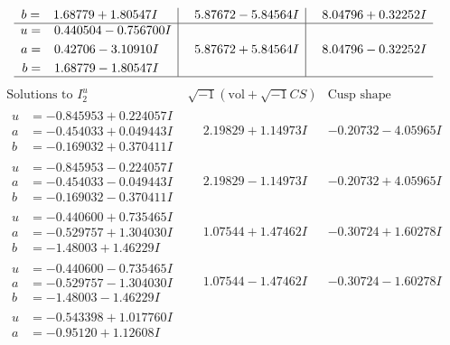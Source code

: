 \documentclass[1p]{elsarticle_modified}
\theoremstyle{definition}
\newcommand{\I}{\sqrt{-1}}
\begin{document}
$$\begin{array}{c|c|c}
\begin{aligned}
b &= \phantom{-}1.68779 + 1.80547 I\end{aligned}
 & \phantom{-}5.87672 - 5.84564 I & \phantom{-}8.04796 + 0.32252 I \\ \hline\begin{aligned}
u &= \phantom{-}0.440504 - 0.756700 I \\
a &= \phantom{-}0.42706 - 3.10910 I \\
b &= \phantom{-}1.68779 - 1.80547 I\end{aligned}
 & \phantom{-}5.87672 + 5.84564 I & \phantom{-}8.04796 - 0.32252 I\\
 \hline 
 \end{array}$$\newpage$$\begin{array}{c|c|c}  
\text{Solutions to }I^u_{2}& \I (\text{vol} + \sqrt{-1}CS) & \text{Cusp shape}\\
 \hline 
\begin{aligned}
u &= -0.845953 + 0.224057 I \\
a &= -0.454033 + 0.049443 I \\
b &= -0.169032 + 0.370411 I\end{aligned}
 & \phantom{-}2.19829 + 1.14973 I & -0.20732 - 4.05965 I \\ \hline\begin{aligned}
u &= -0.845953 - 0.224057 I \\
a &= -0.454033 - 0.049443 I \\
b &= -0.169032 - 0.370411 I\end{aligned}
 & \phantom{-}2.19829 - 1.14973 I & -0.20732 + 4.05965 I \\ \hline\begin{aligned}
u &= -0.440600 + 0.735465 I \\
a &= -0.529757 + 1.304030 I \\
b &= -1.48003 + 1.46229 I\end{aligned}
 & \phantom{-}1.07544 + 1.47462 I & -0.30724 + 1.60278 I \\ \hline\begin{aligned}
u &= -0.440600 - 0.735465 I \\
a &= -0.529757 - 1.304030 I \\
b &= -1.48003 - 1.46229 I\end{aligned}
 & \phantom{-}1.07544 - 1.47462 I & -0.30724 - 1.60278 I \\ \hline\begin{aligned}
u &= -0.543398 + 1.017760 I \\
a &= -0.95120 + 1.12608 I \\

\end{aligned}
\end{array}$$
\end{document}
